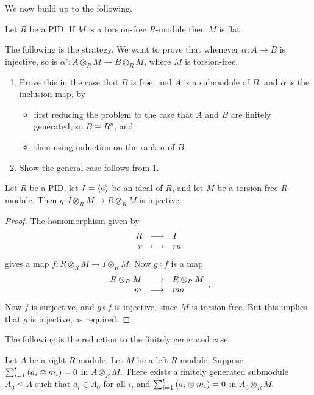 \pagebreak

We now build up to the following.

\begin{proposition}
\label{prop:torsionflat}
Let $ R $ be a PID. If $ M $ is a torsion-free $ R $-module then $ M $ is flat.
\end{proposition}

The following is the strategy. We want to prove that whenever $ \alpha : A \to B $ is injective, so is $ \alpha' : A \otimes_R M \to B \otimes_R M $, where $ M $ is torsion-free.
\begin{enumerate}
\item Prove this in the case that $ B $ is free, and $ A $ is a submodule of $ B $, and $ \alpha $ is the inclusion map, by
\begin{itemize}
\item first reducing the problem to the case that $ A $ and $ B $ are finitely generated, so $ B \cong R^n $, and
\item then using induction on the rank $ n $ of $ B $.
\end{itemize}
\item Show the general case follows from $ 1 $.
\end{enumerate}

\begin{lemma}
\label{lem:torsionflat1}
Let $ R $ be a PID, let $ I = \left\langle a \right\rangle $ be an ideal of $ R $, and let $ M $ be a torsion-free $ R $-module. Then $ g : I \otimes_R M \to R \otimes_R M $ is injective.
\end{lemma}

\begin{proof}
The homomorphism given by
$$ \function{R}{I}{r}{ra} $$
gives a map $ f : R \otimes_R M \to I \otimes_R M $. Now $ g \circ f $ is a map
$$ \function{R \otimes_R M}{R \otimes_R M}{m}{ma}. $$
Now $ f $ is surjective, and $ g \circ f $ is injective, since $ M $ is torsion-free. But this implies that $ g $ is injective, as required.
\end{proof}

The following is the reduction to the finitely generated case.

\begin{lemma}
\label{lem:torsionflat2}
Let $ A $ be a right $ R $-module. Let $ M $ be a left $ R $-module. Suppose $ \sum_{i = 1}^t \br{a_i \otimes m_i} = 0 $ in $ A \otimes_R M $. There exists a finitely generated submodule $ A_0 \le A $ such that $ a_i \in A_0 $ for all $ i $, and $ \sum_{i = 1}^t \br{a_i \otimes m_i} = 0 $ in $ A_0 \otimes_R M $.
\end{lemma}

